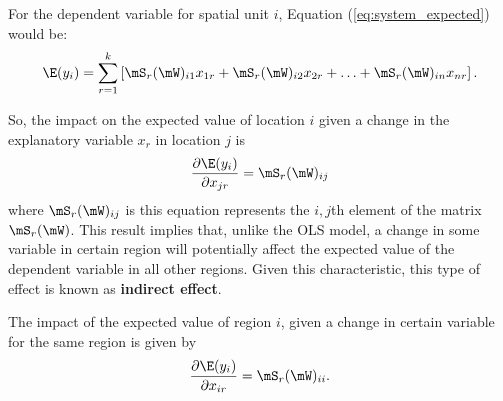\documentclass[english,12pt]{book}\usepackage[]{graphicx}\usepackage[]{xcolor}
\begin{document}
For the dependent variable for spatial unit $i$, Equation (\ref{eq:system_expected}) would be:
\begin{equation}
\E(y_i) = \sum_{r=1}^k\left[\mS_r(\mW)_{i1}x_{1r} + \mS_r(\mW)_{i2}x_{2r} + \ldots + \mS_r(\mW)_{in}x_{nr}\right].
\end{equation}

So, the impact on the expected value of location $i$ given a change in the explanatory variable $x_r$ in location $j$ is
\begin{equation}\label{eq:indirect_impact}
\frac{\partial \E(y_i)}{\partial x_{jr}} = \mS_r(\mW)_{ij}
\end{equation}
%
where $\mS_r(\mW)_{ij}$ is this equation represents the $i,j$th element of the matrix $\mS_r(\mW)$. This result implies that, unlike the OLS model, a change in some variable in certain region will potentially affect the expected value of the dependent variable in all other regions. Given this characteristic, this type of effect is known as \textbf{indirect effect}.

The impact of the expected value of region $i$, given a change in certain variable for the same region is given by
\begin{equation}\label{eq:direct_impact}
\frac{\partial \E(y_i)}{\partial x_{ir}} = \mS_r(\mW)_{ii}.
\end{equation}
\end{document}
